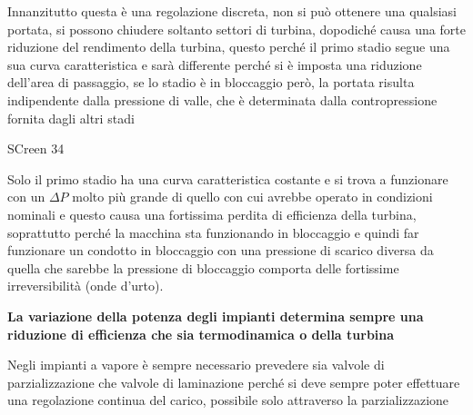 \documentclass[a4paper, 15pt]{article}
\begin{document}
\begin{adjustwidth}{2in}{}
	Innanzitutto questa è una regolazione discreta, non si può ottenere una qualsiasi portata, si possono chiudere soltanto settori di turbina, dopodiché causa una forte riduzione del rendimento della turbina, questo perché il primo stadio segue una sua curva caratteristica e sarà differente perché si è imposta una riduzione dell'area di passaggio, se lo stadio  è in bloccaggio però, la portata risulta indipendente dalla pressione di valle, che è determinata dalla contropressione fornita dagli altri stadi
	
	SCreen 34 
	
	Solo il primo stadio ha una curva caratteristica costante e si trova a funzionare con un $\Delta P$ molto più grande di quello con cui avrebbe operato in condizioni nominali e questo causa una fortissima perdita di efficienza della turbina, soprattutto perché la macchina sta funzionando in bloccaggio e quindi far funzionare un condotto  in bloccaggio con una pressione di scarico diversa da quella che sarebbe la pressione di bloccaggio comporta delle fortissime irreversibilità (onde d'urto). \newline
	
	\begin{center}
		\textbf{La variazione della potenza degli impianti determina sempre una riduzione di efficienza che sia termodinamica o della turbina}\newline
	\end{center}
	
	Negli impianti a vapore è sempre necessario prevedere sia valvole di parzializzazione che valvole di laminazione perché si deve sempre poter effettuare una regolazione continua del carico, possibile solo attraverso la parzializzazione
\end{adjustwidth}
\end{document}
